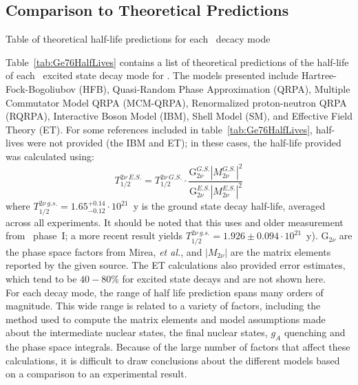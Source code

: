 \documentclass[/main.tex]{subfiles}
\begin{document}
\subsection{Comparison to Theoretical Predictions}
\begin{table}[p]
  \caption[Current half-live limits and predictions for all \tnbb-decay modes of ]{\label{tab:Ge76HalfLives}
    Table of theoretical half-life predictions for each \tnbb\ decacy mode
  }
  \small
  
\end{table}
Table~\ref{tab:Ge76HalfLives} contains a list of theoretical predictions of the half-life of each \tnbb\ excited state decay mode for .
The models presented include Hartree-Fock-Bogoliubov (HFB), Quasi-Random Phase Approximation (QRPA), Multiple Commutator Model QRPA (MCM-QRPA), Renormalized proton-neutron QRPA (RQRPA), Interactive Boson Model (IBM), Shell Model (SM), and  Effective Field Theory (ET).
For some references included in table~\ref{tab:Ge76HalfLives}, half-lives were not provided (the IBM\cite{barea2013, barea2015} and ET\cite{menendez2018}); in these cases, the half-life provided was calculated using:
\begin{equation} \label{eq:hlcalc}
  T^{2\nu~E.S.}_{1/2} = T^{2\nu~G.S.}_{1/2}\cdot\frac{\mathrm{G}_{2\nu}^{G.S.}|M_{2\nu}^{G.S.}|^2}{\mathrm{G}_{2\nu}^{E.S.}|M_{2\nu}^{E.S.}|^2}
\end{equation}
where $T_{1/2}^{2\nu~g.s.}=1.65^{+0.14}_{-0.12}\cdot10^{21}$~y is the ground state decay half-life, averaged across all experiments\cite{barabash2015}.
It should be noted that this uses and older measurement from \Gerda\ phase~I; a more recent result yields $T_{1/2}^{2\nu~g.s.}=1.926\pm0.094\cdot10^{21}$~y\cite{gerda2015}).
$\mathrm{G}_{2\nu}$ are the phase space factors from Mirea, \textit{et al.}\cite{mirea2015}, and $|M_{2\nu}|$ are the matrix elements reported by the given source.
The ET calculations\cite{menendez2018} also provided error estimates, which tend to be $40-80\%$ for excited state decays and are not shown here.
\\
For each decay mode, the range of half life prediction spans many orders of magnitude.
This wide range is related to a variety of factors, including the method used to compute the matrix elements and model assumptions made about the intermediate nuclear states, the final nuclear states, $g_A$ quenching and the phase space integrals.
Because of the large number of factors that affect these calculations, it is difficult to draw conclusions about the different models based on a comparison to an experimental result.
\end{document}
